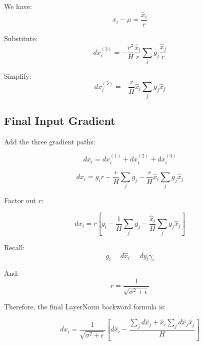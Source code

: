 \documentclass{article}
\begin{document}
We have:
\[
x_i-\mu=\frac{\hat{x}_i}{r}
\]

Substitute:
\[
dx_i^{(3)}
=
-\frac{r^3}{H}
\frac{\hat{x}_i}{r}
\sum_j g_j\frac{\hat{x}_j}{r}
\]

Simplify:
\[
\boxed{
dx_i^{(3)}
=
-\frac{r}{H}\hat{x}_i
\sum_j g_j\hat{x}_j
}
\]

\subsection{Final Input Gradient}

Add the three gradient paths:

\[
dx_i=dx_i^{(1)}+dx_i^{(2)}+dx_i^{(3)}
\]

\[
dx_i
=
g_i r
-\frac{r}{H}\sum_j g_j
-\frac{r}{H}\hat{x}_i\sum_j g_j\hat{x}_j
\]

Factor out $r$:

\[
\boxed{
dx_i
=
r\left[
g_i
-\frac{1}{H}\sum_j g_j
-\frac{\hat{x}_i}{H}\sum_j g_j\hat{x}_j
\right]
}
\]

Recall:
\[
g_i=d\hat{x}_i=dy_i\gamma_i
\]

And:
\[
r=\frac{1}{\sqrt{\sigma^2+\epsilon}}
\]

Therefore, the final LayerNorm backward formula is:

\[
\boxed{
dx_i=
\frac{1}{\sqrt{\sigma^2+\epsilon}}
\left[
d\hat{x}_i
-
\frac{
\sum_j d\hat{x}_j
+
\hat{x}_i\sum_j d\hat{x}_j\hat{x}_j
}{H}
\right]
}
\]
\end{document}
